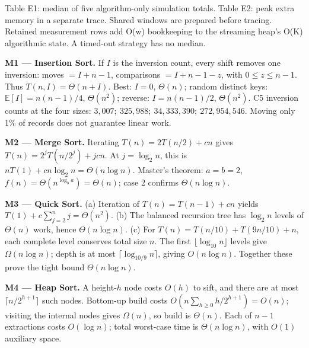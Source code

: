 \documentclass[10pt,a4paper]{article}
\newcommand{\sectiontitle}[1]{\par\vspace{4pt}{\color{teal}\fontsize{12}{14}\selectfont\bfseries #1}\par\vspace{1pt}}
\newcommand{\figcaption}[1]{\par{\fontsize{6.2}{7.1}\selectfont\color{muted}#1}\par\vspace{1pt}}
\begin{document}
\figcaption{Table E1: median of five algorithm-only simulation totals. Table E2: peak extra memory in a separate trace. Shared windows are prepared before tracing. Retained measurement rows add O(w) bookkeeping to the streaming heap's O(K) algorithmic state. A timed-out strategy has no median.}

\newpage
\fontsize{8.1}{9.8}\selectfont

\sectiontitle{F. The Mathematical Case}

\textbf{M1 --- Insertion Sort.} If \(I\) is the inversion count, every
    shift removes one inversion: moves \(=I+n-1\), comparisons
    \(=I+n-1-z\), with \(0\leq z\leq n-1\). Thus \(T(n,I)=\Theta(n+I)\).
    Best: \(I=0\), \(\Theta(n)\); random distinct keys:
    \(\mathbb E[I]=n(n-1)/4\), \(\Theta(n^2)\); reverse:
    \(I=n(n-1)/2\), \(\Theta(n^2)\). C5 inversion counts at the four sizes:
    \(3{,}007;\ 325{,}988;\ 34{,}333{,}390;\ 272{,}954{,}546\).
    Moving only 1\% of records does not guarantee linear work.\par

\textbf{M2 --- Merge Sort.} Iterating
    \(T(n)=2T(n/2)+cn\) gives
    \(T(n)=2^jT(n/2^j)+jcn\).
    At \(j=\log_2n\), this is \(nT(1)+cn\log_2n=\Theta(n\log n)\).
    Master's theorem: \(a=b=2\), \(f(n)=\Theta(n^{\log_ba})=\Theta(n)\);
    case 2 confirms \(\Theta(n\log n)\).\par

\textbf{M3 --- Quick Sort.} (a) Iteration of
    \(T(n)=T(n-1)+cn\) yields
    \(T(1)+c\sum_{j=2}^{n}j=\Theta(n^2)\).
    (b) The balanced recursion tree has \(\log_2n\) levels of
    \(\Theta(n)\) work, hence \(\Theta(n\log n)\).
    (c) For \(T(n)=T(n/10)+T(9n/10)+n\), each complete level conserves
    total size \(n\). The first \(\lfloor\log_{10}n\rfloor\) levels give
    \(\Omega(n\log n)\); depth is at most
    \(\lceil\log_{10/9}n\rceil\), giving \(O(n\log n)\).
    Together these prove the tight bound \(\Theta(n\log n)\).\par

\textbf{M4 --- Heap Sort.} A height-\(h\) node costs \(O(h)\)
    to sift, and there are at most \(\lceil n/2^{h+1}\rceil\) such nodes.
    Bottom-up build costs
    \(O(n\sum_{h\geq0}h/2^{h+1})=O(n)\); visiting the internal nodes gives
    \(\Omega(n)\), so build is \(\Theta(n)\).
    Each of \(n-1\) extractions costs \(O(\log n)\);
    total worst-case time is \(\Theta(n\log n)\), with \(O(1)\) auxiliary space.\par
\end{document}
